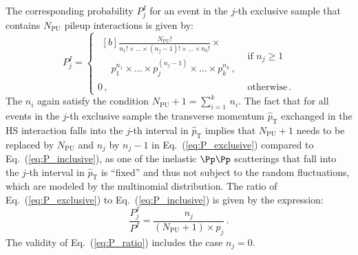 \documentclass[twocolumn,epjc3]{svjour3}
\newcommand{\pThat}{\ensuremath{\hat{p}_{\textrm{T}}}\xspace}
\newcommand{\pileup}{\ensuremath{\textrm{PU}}\xspace}
\begin{document}
The corresponding probability $P_{j}^{I}$ for an event in the $j$-th exclusive sample that contains $N_{\pileup}$ pileup interactions is given by:
\begin{equation}
P_{j}^{I} = \begin{cases}\!
\begin{aligned}[b]
 \frac{N_{\pileup}!}{n_{1}! \times \dots \times (n_{j} - 1)! \times \dots \times n_{k}!} \times \\ 
  \quad p_{1}^{n_{1}} \times \dots \times p_{j}^{(n_{j} - 1)} \times \dots \times p_{k}^{n_{k}} \, ,
\end{aligned} & \text{if $n_{j} \geq 1$} \\
0 \, , & \text{otherwise} \, .
\end{cases}
\label{eq:P_exclusive}
\end{equation}
The $n_{i}$ again satisfy the condition $N_{\pileup} + 1 = \sum_{i=1}^{k} \, n_{i}$.
The fact that for all events in the $j$-th exclusive sample the transverse momentum $\pThat$ exchanged in the HS interaction falls into the $j$-th interval in $\pThat$
implies that $N_{\pileup} + 1$ needs to be replaced by $N_{\pileup}$ and $n_{j}$ by $n_{j} - 1$ in Eq.~(\ref{eq:P_exclusive}) compared to Eq.~(\ref{eq:P_inclusive}),
as one of the inelastic $\Pp\Pp$ scatterings that fall into the $j$-th interval in $\pThat$ is ``fixed'' and thus not subject to the random fluctuations, which are modeled by the multinomial distribution.
The ratio of Eq.~(\ref{eq:P_exclusive}) to Eq.~(\ref{eq:P_inclusive}) is given by the expression:
\begin{equation}
\frac{P_{j}^{I}}{P^{I}} = \frac{n_{j}}{(N_{\pileup} + 1) \times p_{j}} \, .
\label{eq:P_ratio}
\end{equation}
The validity of Eq.~(\ref{eq:P_ratio}) includes the case $n_{j} = 0$.
\end{document}
